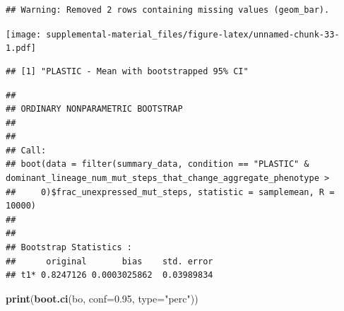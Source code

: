 \documentclass[]{book}
\newenvironment{Shaded}{\begin{snugshade}}{\end{snugshade}}
\newcommand{\DataTypeTok}[1]{\textcolor[rgb]{0.13,0.29,0.53}{#1}}
\newcommand{\DecValTok}[1]{\textcolor[rgb]{0.00,0.00,0.81}{#1}}
\newcommand{\FloatTok}[1]{\textcolor[rgb]{0.00,0.00,0.81}{#1}}
\newcommand{\KeywordTok}[1]{\textcolor[rgb]{0.13,0.29,0.53}{\textbf{#1}}}
\newcommand{\NormalTok}[1]{#1}
\newcommand{\OperatorTok}[1]{\textcolor[rgb]{0.81,0.36,0.00}{\textbf{#1}}}
\newcommand{\StringTok}[1]{\textcolor[rgb]{0.31,0.60,0.02}{#1}}
\begin{document}
\begin{verbatim}
## Warning: Removed 2 rows containing missing values (geom_bar).
\end{verbatim}

\texttt{[image: supplemental-material\_files/figure-latex/unnamed-chunk-33-1.pdf]}

\begin{Shaded}
\end{Shaded}

\begin{verbatim}
## [1] "PLASTIC - Mean with bootstrapped 95% CI"
\end{verbatim}

\begin{Shaded}
\end{Shaded}

\begin{verbatim}
## 
## ORDINARY NONPARAMETRIC BOOTSTRAP
## 
## 
## Call:
## boot(data = filter(summary_data, condition == "PLASTIC" & dominant_lineage_num_mut_steps_that_change_aggregate_phenotype > 
##     0)$frac_unexpressed_mut_steps, statistic = samplemean, R = 10000)
## 
## 
## Bootstrap Statistics :
##      original       bias    std. error
## t1* 0.8247126 0.0003025862  0.03989834
\end{verbatim}

\begin{Shaded}
\begin{Highlighting}[]
\KeywordTok{print}\NormalTok{(}\KeywordTok{boot.ci}\NormalTok{(bo, }\DataTypeTok{conf=}\FloatTok{0.95}\NormalTok{, }\DataTypeTok{type=}\StringTok{"perc"}\NormalTok{))}
\end{Highlighting}
\end{Shaded}
\end{document}
